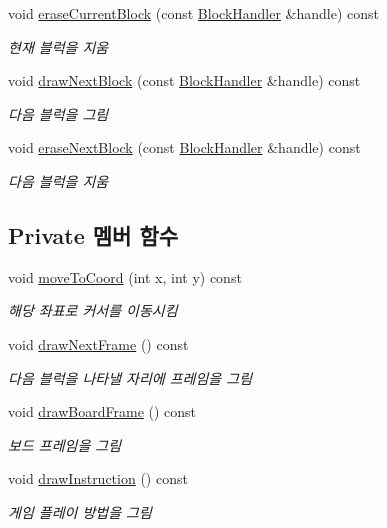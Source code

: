 \begin{DoxyCompactItemize}
void \mbox{\hyperlink{class_drawer_a513de5ba9d65771ed21918a90cd70afa}{erase\+Current\+Block}} (const \mbox{\hyperlink{class_block_handler}{Block\+Handler}} \&handle) const
\begin{DoxyCompactList}\small\item\em 현재 블럭을 지움 \end{DoxyCompactList}\item 
void \mbox{\hyperlink{class_drawer_a6d8f74fa5fae96990547abb2521b5432}{draw\+Next\+Block}} (const \mbox{\hyperlink{class_block_handler}{Block\+Handler}} \&handle) const
\begin{DoxyCompactList}\small\item\em 다음 블럭을 그림 \end{DoxyCompactList}\item 
void \mbox{\hyperlink{class_drawer_a3110e80f9256176373f0580788e69037}{erase\+Next\+Block}} (const \mbox{\hyperlink{class_block_handler}{Block\+Handler}} \&handle) const
\begin{DoxyCompactList}\small\item\em 다음 블럭을 지움 \end{DoxyCompactList}\end{DoxyCompactItemize}
\subsection*{Private 멤버 함수}
\begin{DoxyCompactItemize}
\item 
void \mbox{\hyperlink{class_drawer_ac1a96e007c07cab2e36a7c78484ee9a6}{move\+To\+Coord}} (int x, int y) const
\begin{DoxyCompactList}\small\item\em 해당 좌표로 커서를 이동시킴 \end{DoxyCompactList}\item 
void \mbox{\hyperlink{class_drawer_a2deae79fb268b41b72693d005cdf2178}{draw\+Next\+Frame}} () const
\begin{DoxyCompactList}\small\item\em 다음 블럭을 나타낼 자리에 프레임을 그림 \end{DoxyCompactList}\item 
void \mbox{\hyperlink{class_drawer_a72d01f53fc2c5ff15763dcd76a9b9395}{draw\+Board\+Frame}} () const
\begin{DoxyCompactList}\small\item\em 보드 프레임을 그림 \end{DoxyCompactList}\item 
void \mbox{\hyperlink{class_drawer_a4fb74bcad295250c519bb848dd48b0de}{draw\+Instruction}} () const
\begin{DoxyCompactList}\small\item\em 게임 플레이 방법을 그림 \end{DoxyCompactList}\end{DoxyCompactItemize}


